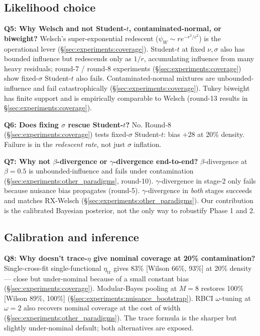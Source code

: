 \subsection{Likelihood choice}

\textbf{Q5: Why Welsch and not Student-$t$, contaminated-normal, or
biweight?}
Welsch's super-exponential redescent
($\psi_W \sim r e^{-r^2/c^2}$) is the operational lever
(\S\ref{sec:experiments:coverage}). Student-$t$ at fixed $\nu, \sigma$
also has bounded influence but redescends only as $1/r$, accumulating
influence from many heavy residuals; round-7 / round-8 experiments
(\S\ref{sec:experiments:coverage}) show fixed-$\sigma$ Student-$t$ also
fails. Contaminated-normal mixtures are unbounded-influence and fail
catastrophically (\S\ref{sec:experiments:coverage}). Tukey biweight
has finite support and is empirically comparable to Welsch
(round-13 results in \S\ref{sec:experiments:coverage}).

\textbf{Q6: Does fixing $\sigma$ rescue Student-$t$?}
No. Round-8 (\S\ref{sec:experiments:coverage}) tests fixed-$\sigma$
Student-$t$: bias $+28$ at 20\% density. Failure is in the
\emph{redescent rate}, not just $\sigma$ inflation.

\textbf{Q7: Why not $\beta$-divergence or $\gamma$-divergence end-to-end?}
$\beta$-divergence at $\beta = 0.5$ is unbounded-influence and fails
under contamination (\S\ref{sec:experiments:other_paradigms},
round-10). $\gamma$-divergence in stage-2 only fails because
nuisance bias propagates (round-5). $\gamma$-divergence in
\emph{both} stages succeeds and matches RX-Welsch
(\S\ref{sec:experiments:other_paradigms}). Our contribution is the
calibrated Bayesian posterior, not the only way to robustify Phase 1
and 2.

\subsection{Calibration and inference}

\textbf{Q8: Why doesn't trace-$\eta$ give nominal coverage at 20\%
contamination?} Single-cross-fit single-functional $\eta_\mathrm{tr}$
gives 83\% [Wilson 66\%, 93\%] at 20\% density --- close but
under-nominal because of a small constant bias (\S\ref{sec:experiments:coverage}).
Modular-Bayes pooling at $M = 8$ restores 100\% [Wilson 89\%, 100\%]
(\S\ref{sec:experiments:nuisance_bootstrap}). RBCI $\omega$-tuning at
$\omega = 2$ also recovers nominal coverage at the cost of width
(\S\ref{sec:experiments:other_paradigms}). The trace formula is the
sharper but slightly under-nominal default; both alternatives are
exposed.

